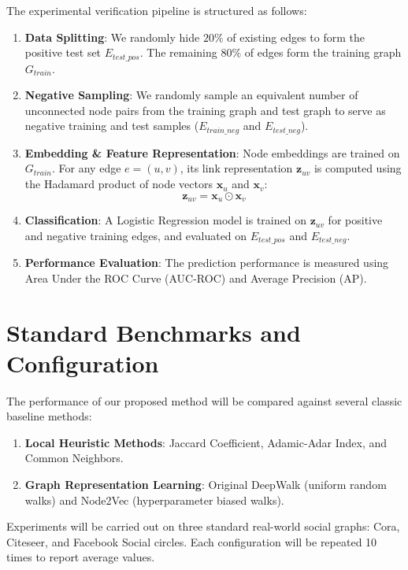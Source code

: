 The experimental verification pipeline is structured as follows:
\begin{enumerate}
    \item \textbf{Data Splitting}: We randomly hide $20\%$ of existing edges to form the positive test set $E_{test\_pos}$. The remaining $80\%$ of edges form the training graph $G_{train}$.
    \item \textbf{Negative Sampling}: We randomly sample an equivalent number of unconnected node pairs from the training graph and test graph to serve as negative training and test samples ($E_{train\_neg}$ and $E_{test\_neg}$).
    \item \textbf{Embedding & Feature Representation}: Node embeddings are trained on $G_{train}$. For any edge $e = (u, v)$, its link representation $\mathbf{z}_{uv}$ is computed using the Hadamard product of node vectors $\mathbf{x}_u$ and $\mathbf{x}_v$:
    \begin{equation}
        \mathbf{z}_{uv} = \mathbf{x}_u \odot \mathbf{x}_v
    \end{equation}
    \item \textbf{Classification}: A Logistic Regression model is trained on $\mathbf{z}_{uv}$ for positive and negative training edges, and evaluated on $E_{test\_pos}$ and $E_{test\_neg}$.
    \item \textbf{Performance Evaluation}: The prediction performance is measured using Area Under the ROC Curve (AUC-ROC) and Average Precision (AP).
\end{enumerate}

\section{Standard Benchmarks and Configuration}

The performance of our proposed method will be compared against several classic baseline methods:
\begin{enumerate}
    \item \textbf{Local Heuristic Methods}: Jaccard Coefficient, Adamic-Adar Index, and Common Neighbors.
    \item \textbf{Graph Representation Learning}: Original DeepWalk (uniform random walks) and Node2Vec (hyperparameter biased walks).
\end{enumerate}
Experiments will be carried out on three standard real-world social graphs: Cora, Citeseer, and Facebook Social circles. Each configuration will be repeated 10 times to report average values.
